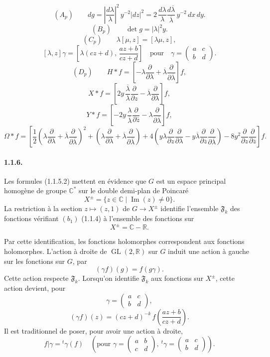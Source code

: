\documentclass[10pt,a4paper]{article}
\providecommand{\GL}{\operatorname{GL}}
\providecommand{\R}{\mathbb R}
\providecommand{\C}{\mathbb C}
\begin{document}
\clearpage
{}
\hypertarget{authority-13}{}
\[
(A_p)\qquad
dg=\left|\frac{d\lambda}{\lambda}\right|^2\,y^{-2}|dz|^2
=
2\,\frac{d\lambda}{\lambda}\frac{d\overline\lambda}{\overline\lambda}\,y^{-2}\,dx\,dy.
\]
\[
(B_p)\qquad
\det g=|\lambda|^2y.
\]
\[
(C_p)\qquad
\lambda[\mu,z]=[\lambda\mu,z],
\]
\[
[\lambda,z]\gamma=
\left[\lambda(cz+d),\,\frac{az+b}{cz+d}\right]
\quad\text{pour}\quad
\gamma=\begin{pmatrix}a&c\\ b&d\end{pmatrix}.
\]
\[
(D_p)\qquad
H*f=\left[-\lambda\frac{\partial}{\partial\lambda}
+\overline\lambda\frac{\partial}{\partial\overline\lambda}\right]f,
\]
\[
X*f=\left[2y\,\frac{\overline\lambda}{\lambda}\frac{\partial}{\partial z}
-\overline\lambda\frac{\partial}{\partial\lambda}\right]f,
\]
\[
Y*f=\left[-2y\,\frac{\lambda}{\overline\lambda}\frac{\partial}{\partial\overline z}
-\lambda\frac{\partial}{\partial\overline\lambda}\right]f,
\]
\[
\Omega*f=
\left[
\frac12\left(\lambda\frac{\partial}{\partial\lambda}
+\overline\lambda\frac{\partial}{\partial\overline\lambda}\right)^2
+\left(\lambda\frac{\partial}{\partial\lambda}
+\overline\lambda\frac{\partial}{\partial\overline\lambda}\right)
+4\left(y\lambda\frac{\partial}{\partial z}\frac{\partial}{\partial\lambda}
-y\overline\lambda\frac{\partial}{\partial\overline z}\frac{\partial}{\partial\overline\lambda}\right)
-8y^2\frac{\partial}{\partial z}\frac{\partial}{\partial\overline z}
\right]f.
\]

\paragraph{1.1.6.} Les formules (1.1.5.2) mettent en évidence que \(G\) est un espace principal homogène de groupe \(\C^*\) sur le double demi-plan de Poincaré
\[
X^\pm=\{z\in\C\mid \operatorname{Im}(z)\ne0\}.
\]
La restriction à la section \(z\mapsto(z,1)\) de \(G\to X^\pm\) identifie l'ensemble \(\mathfrak F_k\) des fonctions vérifiant \((b_1)\) (1.1.4) à l'ensemble des fonctions sur
\[
X^\pm=\C-\R.
\]

\clearpage
{}
\hypertarget{authority-14}{}
Par cette identification, les fonctions holomorphes correspondent aux fonctions holomorphes. L'action à droite de \(\GL(2,\R)\) sur \(G\) induit une action à gauche sur les fonctions sur \(G\), par
\[
(\gamma f)(g)=f(g\gamma).
\]
Cette action respecte \(\mathfrak F_k\). Lorsqu'on identifie \(\mathfrak F_k\) aux fonctions sur \(X^\pm\), cette action devient, pour
\[
\gamma=\begin{pmatrix}a&c\\ b&d\end{pmatrix},
\]
\[
(\gamma f)(z)=(cz+d)^{-k}\,
f\!\left(\frac{az+b}{cz+d}\right).
\]
Il est traditionnel de poser, pour avoir une action à droite,
\[
f|\gamma={}^{t}\gamma(f)
\quad
\left(\text{pour }\gamma=\begin{pmatrix}a&b\\ c&d\end{pmatrix},\ 
{}^{t}\gamma=\begin{pmatrix}a&c\\ b&d\end{pmatrix}\right).
\]
\end{document}
